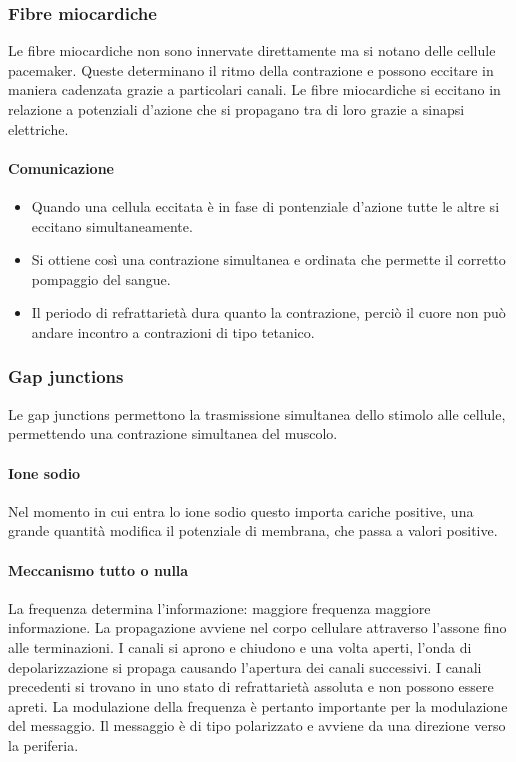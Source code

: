 		\subsubsection{Fibre miocardiche}
		Le fibre miocardiche non sono innervate direttamente ma si notano delle cellule pacemaker.
		Queste determinano il ritmo della contrazione e possono eccitare in maniera cadenzata grazie a particolari canali.
		Le fibre miocardiche si eccitano in relazione a potenziali d'azione che si propagano tra di loro grazie a sinapsi elettriche.

			\paragraph{Comunicazione}
			\begin{multicols}{2}
				\begin{itemize}
					\item Quando una cellula eccitata \`e in fase di pontenziale d'azione tutte le altre si eccitano simultaneamente.
					\item Si ottiene cos\`i una contrazione simultanea e ordinata che permette il corretto pompaggio del sangue.
					\item Il periodo di refrattariet\`a dura quanto la contrazione, perci\`o il cuore non pu\`o andare incontro a contrazioni di tipo tetanico.
				\end{itemize}
			\end{multicols}

		\subsubsection{Gap junctions}
		Le gap junctions permettono la trasmissione simultanea dello stimolo alle cellule, permettendo una contrazione simultanea del muscolo.
		
			\paragraph{Ione sodio}
			Nel momento in cui entra lo ione sodio questo importa cariche positive, una grande quantit\`a modifica il potenziale di membrana, che passa a valori positive.

			\paragraph{Meccanismo tutto o nulla}
			La frequenza determina l'informazione: maggiore frequenza maggiore informazione.
			La propagazione avviene nel corpo cellulare attraverso l'assone fino alle terminazioni.
			I canali si aprono e chiudono e una volta aperti, l'onda di depolarizzazione si propaga causando l'apertura dei canali successivi.
			I canali precedenti si trovano in uno stato di refrattariet\`a assoluta e non possono essere apreti.
			La modulazione della frequenza \`e pertanto importante per la modulazione del messaggio.
			Il messaggio \`e di tipo polarizzato e avviene da una direzione verso la periferia.

